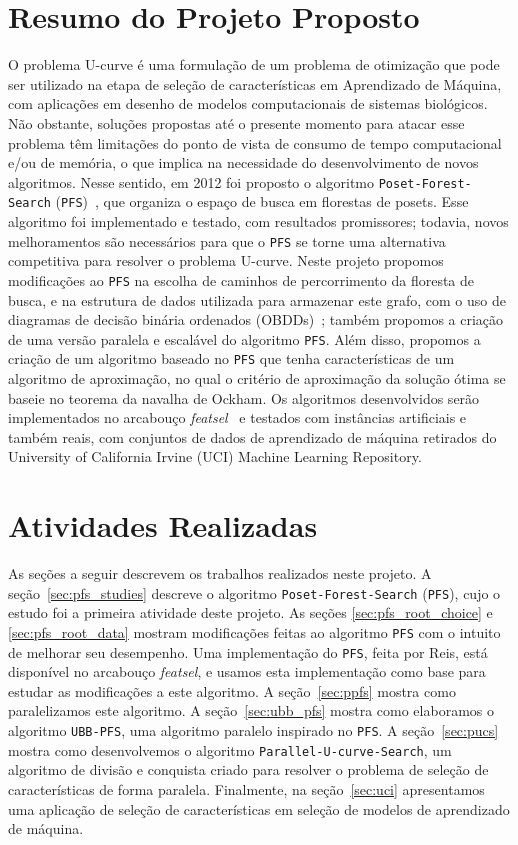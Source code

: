 \documentclass[12pt]{article}
\newcommand{\toolname}[1]{\textit{#1}}
\newcommand{\algname}[1]{\texttt{#1}}
\begin{document}
\section{Resumo do Projeto Proposto} \label{sec:resumo} %
O problema U-curve é uma formulação de um problema de otimização que 
pode ser utilizado na etapa de seleção de características em 
Aprendizado de Máquina, com aplicações em desenho de modelos 
computacionais de sistemas biológicos. Não obstante, soluções propostas 
até o presente momento para atacar esse problema têm limitações do 
ponto de vista de consumo de tempo computacional e/ou de memória, o que 
implica na necessidade do desenvolvimento de novos algoritmos. Nesse 
sentido, em 2012 foi proposto o algoritmo 
\algname{Poset\--Forest\--Search} (\algname{PFS})~\cite{msreis thesis}, 
que organiza o espaço de busca em florestas de posets. Esse algoritmo 
foi implementado e testado, com resultados promissores; todavia, novos 
melhoramentos são necessários para que o \algname{PFS} se torne uma 
alternativa competitiva para resolver o problema U-curve. Neste projeto 
propomos modificações ao \algname{PFS} na escolha de caminhos de 
percorrimento da floresta de busca, e na estrutura de dados utilizada 
para armazenar este grafo, com o uso de diagramas de decisão binária 
ordenados (OBDDs)~\cite{bryant}; também propomos a criação 
de uma versão paralela e escalável do algoritmo \algname{PFS}. Além 
disso, propomos a criação de um algoritmo baseado no \algname{PFS} que 
tenha características de um algoritmo de aproximação, no qual o critério 
de aproximação da solução ótima se baseie no teorema da navalha de 
Ockham. Os algoritmos desenvolvidos serão implementados no arcabouço 
\toolname{featsel}~\cite{featsel paper} e testados com instâncias 
artificiais e também reais, com conjuntos de dados de aprendizado de 
máquina retirados do University of California Irvine (UCI) Machine 
Learning Repository.

 
\section{Atividades Realizadas}
As seções a seguir descrevem os trabalhos realizados neste projeto. A
seção~\ref{sec:pfs_studies} descreve o algoritmo 
\algname{Poset\--Forest\--Search} (\algname{PFS}), cujo o estudo foi a
primeira atividade deste projeto. As seções \ref{sec:pfs_root_choice} e 
\ref{sec:pfs_root_data} mostram modificações feitas ao algoritmo
\algname{PFS} com o intuito de melhorar seu desempenho. Uma 
implementação do \algname{PFS}, feita por Reis, está disponível no
arcabouço \toolname{featsel}, e usamos esta implementação como base para
estudar as modificações a este algoritmo. A seção~\ref{sec:ppfs}
mostra como paralelizamos este algoritmo. A seção~\ref{sec:ubb_pfs} 
mostra como elaboramos o algoritmo \algname{UBB-PFS}, uma algoritmo
paralelo inspirado no \algname{PFS}. A seção~\ref{sec:pucs} 
mostra como desenvolvemos o algoritmo 
\algname{Parallel\--U\--curve\--Search}, um algoritmo de divisão e 
conquista criado para resolver o problema de seleção de características 
de forma paralela. Finalmente, na seção~\ref{sec:uci} apresentamos uma
aplicação de seleção de características em seleção de modelos de 
aprendizado de máquina.
\end{document}
